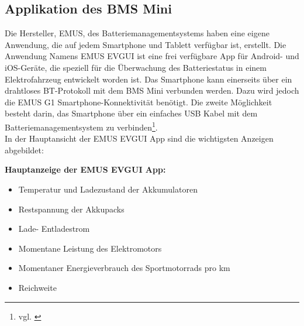 \subsection{Applikation des BMS Mini}

Die Hersteller, EMUS, des Batteriemanagementsystems haben eine eigene Anwendung, die auf jedem Smartphone und Tablett verfügbar ist, erstellt. Die Anwendung Namens EMUS EVGUI ist eine frei verfügbare App für Android- und iOS-Geräte, die speziell für die Überwachung des Batteriestatus in einem Elektrofahrzeug entwickelt worden ist. Das Smartphone kann einerseits über ein drahtloses BT-Protokoll mit dem BMS Mini verbunden werden. Dazu wird jedoch die EMUS G1 Smartphone-Konnektivität benötigt. Die zweite Möglichkeit besteht darin, das Smartphone über ein einfaches USB Kabel mit dem Batteriemanagementsystem zu verbinden\footnote{vgl. \cite{ApplikationBMS}}.\\

In der Hauptansicht der EMUS EVGUI App sind die wichtigsten Anzeigen abgebildet:

\textbf{Hauptanzeige der EMUS EVGUI App:}
\begin{itemize}
\item{Temperatur und Ladezustand der Akkumulatoren}\\
\item{Restspannung der Akkupacks}\\
\item{Lade- Entladestrom}\\
\item{Momentane Leistung des Elektromotors}\\
\item{Momentaner Energieverbrauch des Sportmotorrads pro km}\\
\item{Reichweite}\\
\end{itemize}


